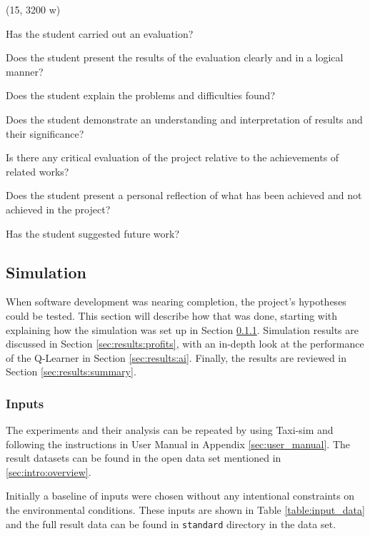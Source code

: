 (15, 3200 w)

Has the student carried out an evaluation?

Does the student present the results of the evaluation clearly and in a logical
manner?

Does the student explain the problems and difficulties found?

Does the student demonstrate an understanding and interpretation of results and
their significance?

Is there any critical evaluation of the project relative to the achievements of
related works?

Does the student present a personal reflection of what has been achieved and
not achieved in the project?

Has the student suggested future work?



\subsection{Simulation}
\label{sec:results}

When software development was nearing completion, the project's hypotheses
could be tested. This section will describe how that was done, starting with
explaining how the simulation was set up in Section \ref{sec:results:inputs}.
Simulation results are discussed in Section \ref{sec:results:profits}, with an
in-depth look at the performance of the Q-Learner in Section
\ref{sec:results:ai}. Finally, the results are reviewed in Section
\ref{sec:results:summary}.


\subsubsection{Inputs}
\label{sec:results:inputs}

The experiments and their analysis can be repeated by using Taxi-sim and
following the instructions in User Manual in Appendix \ref{sec:user_manual}.
The result datasets can be found in the open data set mentioned in
\ref{sec:intro:overview}.

Initially a baseline of inputs were chosen without any intentional constraints
on the environmental conditions. These inputs are shown in Table
\ref{table:input_data} and the full result data can be found in
\texttt{standard} directory in the data set.

